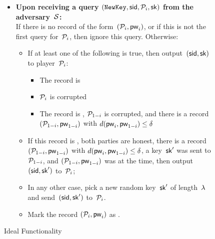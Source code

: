 \begin{figure}[tb]
\begin{fboxenv}
\begin{minipage}{0.95\textwidth}
\begin{itemize}
      \item
        \textbf{Upon receiving a query
          $(\texttt{NewKey},\mathsf{sid},\mathcal{P}_{i},\mathsf{sk})$ from the adversary~$\mathcal{S}$:} \\
        If there is no record of the form~$(\mathcal{P}_{i},\mathsf{pw}_{i})$, or if this is not the first \NewKey query for~$\mathcal{P}_{i}$, then ignore this query. 
        Otherwise:
        \begin{itemize}
        \item If at least one of the following is true, then output~$(\mathsf{sid},\mathsf{sk})$ to player~$\mathcal{P}_{i}$:
          \begin{itemize}
           \item The record is 
           \item $\mathcal{P}_{i}$ is corrupted
           \item The record is , $\mathcal{P}_{1-i}$ is corrupted, and there is a record~$(\mathcal{P}_{1-i},\mathsf{pw}_{1-i})$ with $d(\mathsf{pw}_{i},\mathsf{pw}_{1-i}) \leq \delta$
          \end{itemize}
        \item If this record is , both parties are honest,
          there is a record~$(\mathcal{P}_{1-i},\mathsf{pw}_{1-i})$ with $d(\mathsf{pw}_{i},\mathsf{pw}_{1-i}) \leq \delta$,
          a key~$\mathsf{sk}'$ was sent to~$\mathcal{P}_{1-i}$, and $(\mathcal{P}_{1-i},\mathsf{pw}_{1-i})$ was  at the time,
          then output~$(\mathsf{sid},\mathsf{sk}')$ to~$\mathcal{P}_{i}$;
        \item In any other case, pick a new random key~$\mathsf{sk}'$ of length~$\lambda$ and send~$(\mathsf{sid},\mathsf{sk}')$ to~$\mathcal{P}_{i}$.
        \item Mark the record $(\mathcal{P}_{i},\mathsf{pw}_{i})$ as .
        \end{itemize}
      \end{itemize}
    \end{minipage}
  \end{fboxenv}
  \caption{Ideal Functionality \FAKE}
  \label{fig:func-UC-FAKE}
\end{figure}


